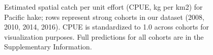 \documentclass[
]{article}
\begin{document}
\begin{figure}


\caption{\label{fig-hake-spatial-composition}Estimated spatial catch per
unit effort (CPUE, kg per km2) for Pacific hake; rows represent strong
cohorts in our dataset (2008, 2010, 2014, 2016). CPUE is standardized to
1.0 across cohorts for visualization purposes. Full predictions for all
cohorts are in the Supplementary Information.}

\end{figure}%

\newpage
\end{document}
